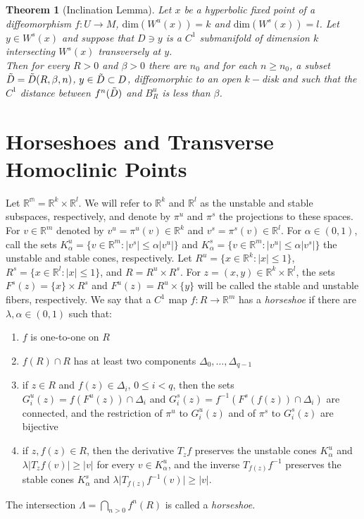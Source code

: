 \documentclass{article}
\newtheorem{thm}{Theorem}
\begin{document}
\begin{thm}[Inclination Lemma]
Let $x$ be a hyperbolic fixed point of a diffeomorphism $f:U \to M$, $\mathrm{dim}(W^u(x))=k$ and $\mathrm{dim}(W^s(x))=l$. Let $y \in W^s(x)$ and suppose that $D \ni y$ is a $C^1$ submanifold of dimension $k$ intersecting $W^s(x)$ transversely at $y$. \\
\indent Then for every $R > 0$ and $\beta > 0$ there are $n_0$ and for each $n \geq n_0$, a subset $\Tilde{D}=\Tilde{D}(R,\beta,n)$, $y \in \Tilde{D} \subset D$, diffeomorphic to an open $k-$disk and such that the $C^1$ distance between $f^n(\Tilde{D})$ and $B^u_R$ is less than $\beta$.

\end{thm}

\section{Horseshoes and Transverse Homoclinic Points}

Let $\mathbb{R^m}= \mathbb{R}^k \times \mathbb{R}^l$. We will refer to $\mathbb{R}^k$ and $\mathbb{R}^l$ as the unstable and stable subspaces, respectively, and denote by $\pi^u$ and $\pi^s$ the projections to these spaces. For $v \in \mathbb{R}^m$ denoted by $v^u = \pi^u(v) \in \mathbb{R}^k$ and $v^s = \pi^s(v) \in \mathbb{R}^l$. For $\alpha \in (0,1)$, call the sets $K^u_{\alpha} = \{ v \in \mathbb{R}^m: \vert v^s \vert \leq \alpha \vert v^u \vert \}$ and $K^s_{\alpha} = \{ v \in \mathbb{R}^m: \vert v^u \vert \leq \alpha \vert v^s \vert \}$ the unstable and stable cones, respectively. Let $R^u = \{ x \in \mathbb{R}^k: \vert x \vert \leq 1 \}$, $R^s = \{ x \in \mathbb{R}^l : \vert x \vert \leq 1 \} $, and $R = R^u \times R^s$. For $z = (x,y) \in \mathbb{R}^k \times \mathbb{R}^l$, the sets $F^s(z) = \{x \} \times R^s$ and $F^u(z) = R^u \times \{y\}$ will be called the stable and unstable fibers, respectively. We say that a $C^1$ map $f:R \to \mathbb{R}^m$ has a \textit{horseshoe} if there are $\lambda, \alpha \in (0,1)$ such that:

\begin{enumerate}
    \item $f$ is one-to-one on $R$
    \item $f(R) \cap R$ has at least two components $\Delta_0, \ldots, \Delta_{q-1}$
    \item if $z \in R$ and $f(z) \in \Delta_i, \hspace{2pt} 0 \leq i < q$, then the sets $G^u_i(z) = f(F^u(z)) \cap \Delta_i$ and $G^s_i(z) = f^{-1}(F^s(f(z)) \cap \Delta_i)$ are connected, and the restriction of $\pi^u$ to $G^u_i(z)$ and of $\pi^s$ to $G^s_i(z)$ are bijective
    \item if $z, f(z) \in R$, then the derivative $T_zf$ preserves the unstable cones $K^u_{\alpha}$ and $\lambda \vert T_zf (v) \vert \geq \vert v \vert$ for every $v \in K^u_{\alpha}$, and the inverse $T_{f(z)}f^{-1}$ preserves the stable cones $K^s_{\alpha}$ and $\lambda \vert T_{f(z)}f^{-1}(v) \vert \geq \vert v \vert$.
\end{enumerate}
The intersection $\Lambda=\bigcap_{n>0}f^n(R)$ is called a \textit{horseshoe}.
\end{document}
